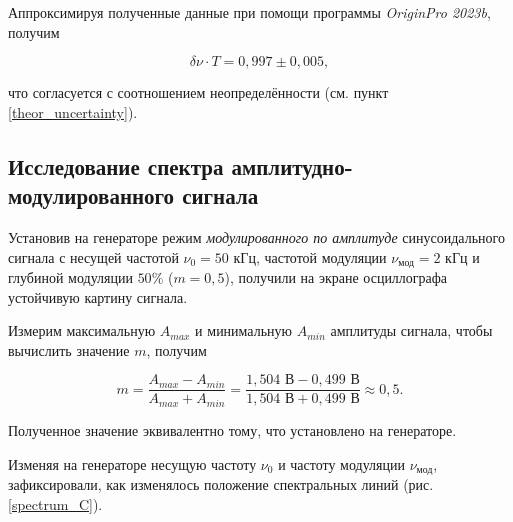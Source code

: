 \documentclass[a4paper, 12pt]{article}
\begin{document}
    Аппроксимируя полученные данные при помощи программы \textit{OriginPro 2023b}, получим

    $$
    \boxed{\delta \nu \cdot T = 0,997 \pm 0,005}, 
    $$

    что согласуется с соотношением неопределённости (см. пункт \ref{theor_uncertainty}).

    \subsection{Исследование спектра амплитудно-модулированного сигнала}

    Установив на генераторе режим \textit{модулированного по амплитуде} синусоидального сигнала с несущей частотой $\nu_0 = 50$ кГц, частотой модуляции $\nu_\text{мод} = 2$ кГц и глубиной модуляции $50 \%$ ($m = 0,5$), получили на экране осциллографа устойчивую картину сигнала.

    Измерим максимальную $A_{max}$ и минимальную $A_{min}$ амплитуды сигнала, чтобы вычислить значение $m$, получим

    \begin{equation*}
         m = \frac{A_{max} - A_{min}}{A_{max} + A_{min}} = \frac{1,504 \text{ В} - 0,499 \text{ В}}{1,504 \text{ В} + 0,499 \text{ В}} \approx 0,5.
    \end{equation*}

    Полученное значение эквивалентно тому, что установлено на генераторе.

    Изменяя на генераторе несущую частоту $\nu_0$ и частоту модуляции $\nu_\text{мод}$, зафиксировали, как изменялось положение спектральных линий (рис. \ref{spectrum_C}).
\end{document}
